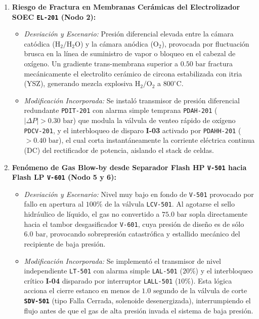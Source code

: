 \documentclass[10pt,letterpaper]{article}
\begin{document}
\begin{enumerate}
    \item \textbf{Riesgo de Fractura en Membranas Cerámicas del Electrolizador SOEC \texttt{EL-201} (Nodo 2):}
    \begin{itemize}
        \item \textit{Desviación y Escenario:} Presión diferencial elevada entre la cámara catódica ($\text{H}_2/\text{H}_2\text{O}$) y la cámara anódica ($\text{O}_2$), provocada por fluctuación brusca en la línea de suministro de vapor o bloqueo en el cabezal de oxígeno. Un gradiente trans-membrana superior a $0.50\text{ bar}$ fractura mecánicamente el electrolito cerámico de circona estabilizada con itria (YSZ), generando mezcla explosiva $\text{H}_2/\text{O}_2$ a $800^\circ\text{C}$.
        \item \textit{Modificación Incorporada:} Se instaló transmisor de presión diferencial redundante \texttt{PDIT-201} con alarma simple temprana \texttt{PDAH-201} ($|\Delta P| > 0.30\text{ bar}$) que modula la válvula de venteo rápido de oxígeno \texttt{PDCV-201}, y el interbloqueo de disparo \textbf{I-03} activado por \texttt{PDAHH-201} ($>0.40\text{ bar}$), el cual corta instantáneamente la corriente eléctrica continua (DC) del rectificador de potencia, aislando el stack de celdas.
    \end{itemize}

    \item \textbf{Fenómeno de Gas Blow-by desde Separador Flash HP \texttt{V-501} hacia Flash LP \texttt{V-601} (Nodo 5 y 6):}
    \begin{itemize}
        \item \textit{Desviación y Escenario:} Nivel muy bajo en fondo de \texttt{V-501} provocado por fallo en apertura al $100\%$ de la válvula \texttt{LCV-501}. Al agotarse el sello hidráulico de líquido, el gas no convertido a $75.0\text{ bar}$ sopla directamente hacia el tambor desgasificador \texttt{V-601}, cuya presión de diseño es de sólo $6.0\text{ bar}$, provocando sobrepresión catastrófica y estallido mecánico del recipiente de baja presión.
        \item \textit{Modificación Incorporada:} Se implementó el transmisor de nivel independiente \texttt{LT-501} con alarma simple \texttt{LAL-501} ($20\%$) y el interbloqueo crítico \textbf{I-04} disparado por interruptor \texttt{LALL-501} ($10\%$). Esta lógica acciona el cierre estanco en menos de $1.0\text{ segundo}$ de la válvula de corte \textbf{\texttt{SDV-501}} (tipo Falla Cerrada, solenoide desenergizada), interrumpiendo el flujo antes de que el gas de alta presión invada el sistema de baja presión.
    \end{itemize}
\end{enumerate}
\end{document}
